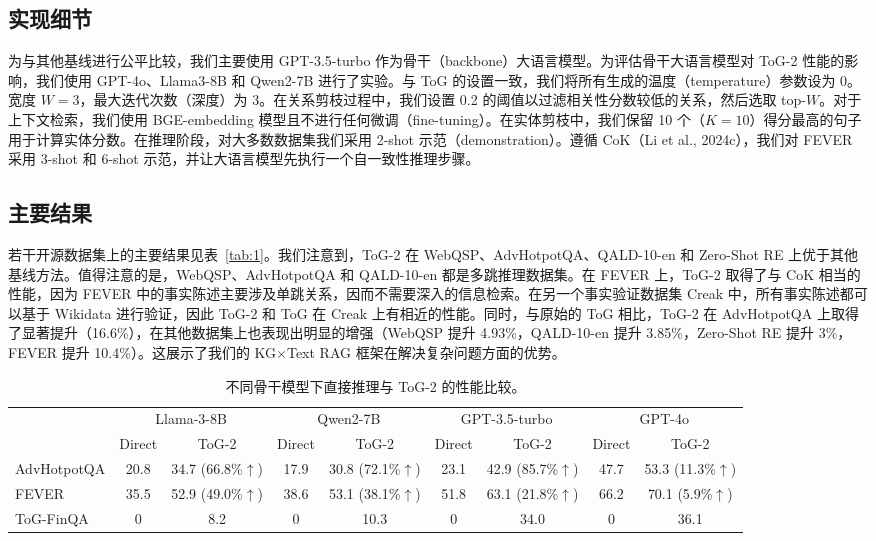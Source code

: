 \documentclass[11pt,UTF8,fontset=fandol]{ctexart}
\newcommand{\toctwo}{ToG-2}
\begin{document}
\subsection{实现细节}

为与其他基线进行公平比较，我们主要使用 GPT-3.5-turbo 作为骨干（backbone）大语言模型。为评估骨干大语言模型对 \toctwo{} 性能的影响，我们使用 GPT-4o、Llama3-8B 和 Qwen2-7B 进行了实验。与 ToG 的设置一致，我们将所有生成的温度（temperature）参数设为 0。宽度 $W=3$，最大迭代次数（深度）为 3。在关系剪枝过程中，我们设置 0.2 的阈值以过滤相关性分数较低的关系，然后选取 top-$W$。对于上下文检索，我们使用 BGE-embedding 模型且不进行任何微调（fine-tuning）。在实体剪枝中，我们保留 10 个（$K=10$）得分最高的句子用于计算实体分数。在推理阶段，对大多数数据集我们采用 2-shot 示范（demonstration）。遵循 CoK（Li et al., 2024c），我们对 FEVER 采用 3-shot 和 6-shot 示范，并让大语言模型先执行一个自一致性推理步骤。

\subsection{主要结果}

若干开源数据集上的主要结果见表~\ref{tab:1}。我们注意到，\toctwo{} 在 WebQSP、AdvHotpotQA、QALD-10-en 和 Zero-Shot RE 上优于其他基线方法。值得注意的是，WebQSP、AdvHotpotQA 和 QALD-10-en 都是多跳推理数据集。在 FEVER 上，\toctwo{} 取得了与 CoK 相当的性能，因为 FEVER 中的事实陈述主要涉及单跳关系，因而不需要深入的信息检索。在另一个事实验证数据集 Creak 中，所有事实陈述都可以基于 Wikidata 进行验证，因此 \toctwo{} 和 ToG 在 Creak 上有相近的性能。同时，与原始的 ToG 相比，\toctwo{} 在 AdvHotpotQA 上取得了显著提升（16.6\%），在其他数据集上也表现出明显的增强（WebQSP 提升 4.93\%，QALD-10-en 提升 3.85\%，Zero-Shot RE 提升 3\%，FEVER 提升 10.4\%）。这展示了我们的 KG$\times$Text RAG 框架在解决复杂问题方面的优势。

\begin{table}[H]\centering
\caption{不同骨干模型下直接推理与 \toctwo{} 的性能比较。}
\setlength{\tabcolsep}{4pt}
\renewcommand{\arraystretch}{1.2}
\small
\begin{tabular}{lcccccccc}
\toprule
 & \multicolumn{2}{c}{Llama-3-8B} & \multicolumn{2}{c}{Qwen2-7B} & \multicolumn{2}{c}{GPT-3.5-turbo} & \multicolumn{2}{c}{GPT-4o}\\
\cmidrule(lr){2-3}\cmidrule(lr){4-5}\cmidrule(lr){6-7}\cmidrule(lr){8-9}
 & Direct & \toctwo{} & Direct & \toctwo{} & Direct & \toctwo{} & Direct & \toctwo{}\\
\midrule
AdvHotpotQA & 20.8 & 34.7 (66.8\%$\uparrow$) & 17.9 & 30.8 (72.1\%$\uparrow$) & 23.1 & 42.9 (85.7\%$\uparrow$) & 47.7 & 53.3 (11.3\%$\uparrow$)\\
FEVER & 35.5 & 52.9 (49.0\%$\uparrow$) & 38.6 & 53.1 (38.1\%$\uparrow$) & 51.8 & 63.1 (21.8\%$\uparrow$) & 66.2 & 70.1 (5.9\%$\uparrow$)\\
ToG-FinQA & 0 & 8.2 & 0 & 10.3 & 0 & 34.0 & 0 & 36.1\\
\bottomrule
\end{tabular}
\label{tab:3}
\end{table}
\end{document}
